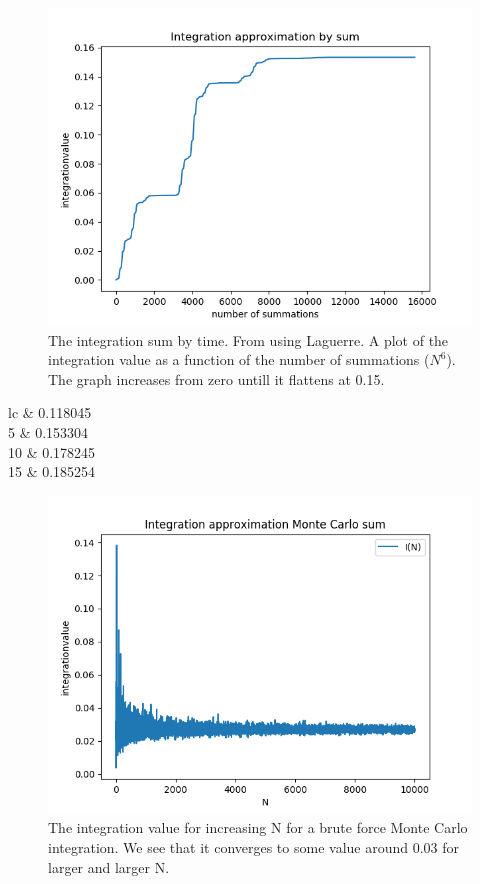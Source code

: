 \documentclass{emulateapj}
\begin{document}
	\begin{figure}
		\centering
		\includegraphics[scale=0.6]{Figure_1.png}
		\caption{The integration sum by time. From using Laguerre. A plot of the integration value as a function of the number of summations ($N^6$). The graph increases from zero untill it flattens at 0.15.}
		\label{fig:lagint}
	\end{figure}
	
	
	\begin{deluxetable}{lc}
		\tablewidth{200pt}
		 & 0.118045 \\
		5 & 0.153304 \\
		10 & 0.178245 \\
		15 & 0.185254
		\enddata
	\end{deluxetable}
	
	\begin{figure}
		\centering
		\includegraphics[scale=0.6]{Figur01.png}
		\caption{The integration value for increasing N for a brute force Monte Carlo integration. We see that it converges to some value around $0.03$ for larger and larger N.}
		\label{fig:BFMC}
	\end{figure}
	
\end{document}
